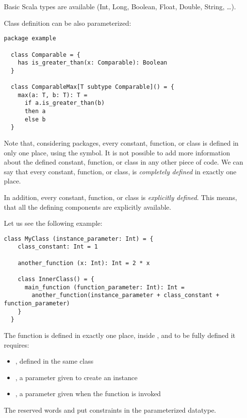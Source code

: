 Basic Scala types are available (Int, Long, Boolean, Float, Double, String, \ldots).

Class definition can be also parameterized:
\begin{lstlisting}[label={lst:exampleParameterizedClass}]
  package example

  class Comparable = {
    has is_greater_than(x: Comparable): Boolean
  }

  class ComparableMax[T subtype Comparable]() = {
    max(a: T, b: T): T =
      if a.is_greater_than(b)
      then a
      else b
  }
\end{lstlisting}

Note that, considering packages, every constant, function, or class is defined in only one place, using the \sdef symbol.
It is not possible to add more information about the defined constant, function, or class in any other piece of code.
We can say that every constant, function, or class, is \emph{completely defined} in exactly one place.

In addition, every constant, function, or class is \emph{explicitly defined}.
This means, that all the defining components are explicitly available.

Let us see the following example:
\begin{lstlisting}[label={lst:exampleExplicitDefinition}]
  class MyClass (instance_parameter: Int) = {
    class_constant: Int = 1

    another_function (x: Int): Int = 2 * x

    class InnerClass() = {
      main_function (function_parameter: Int): Int =
        another_function(instance_parameter + class_constant + function_parameter)
    }
  }
\end{lstlisting}

The function  is defined in exactly one place, inside , and to be fully defined it requires:
\begin{itemize}
    \item {}, defined in the same class
    \item {}, a parameter given to create an instance
    \item {}, a parameter given when the function is invoked
\end{itemize}

The reserved words \ssubtype and \ssupertype put constraints in the parameterized datatype.

